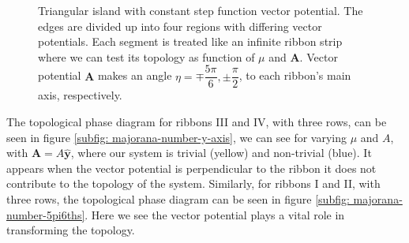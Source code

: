 \documentclass[aps,prb,showpacs,amsmath,amssymb,superscriptaddress]{revtex4-2}
\let\oldhat\hat
\renewcommand{\hat}[1]{\oldhat{\mathbf{#1}}}
\renewcommand{\vec}[1]{\mathbf{#1}}
\begin{document}
\begin{figure}[]
  \label{fig: triangular-island-vector-potential-divided}
  \caption{Triangular island with constant step function vector potential. The edges are divided up into four regions with differing vector potentials. Each segment is treated like an infinite ribbon strip where we can test its topology as function of $\mu$ and $\vec{A}$. Vector potential $\vec{A}$ makes an angle $\eta =  \mp \dfrac{5\pi}{6}, \pm \dfrac{\pi}{2}$, to each ribbon's main axis, respectively.}
\end{figure}

The topological phase diagram for ribbons III and IV, with three rows, can be seen in figure \ref{subfig: majorana-number-y-axis}, we can see for varying $\mu$ and $A$, with $\vec{A} = A\hat{y}$, where our system is trivial (yellow) and non-trivial (blue).
It appears when the vector potential is perpendicular to the ribbon it does not contribute to the topology of the system.
Similarly, for ribbons I and II, with three rows, the topological phase diagram can be seen in figure \ref{subfig: majorana-number-5pi6ths}.
Here we see the vector potential plays a vital role in transforming the topology.
\end{document}
